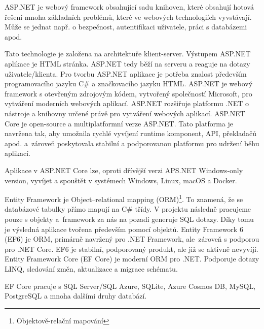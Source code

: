 \documentclass[a4paper, 12pt]{report}
\begin{document}
			ASP.NET je webový framework obsahující sadu knihoven, které obsahují hotová řešení mnoha základních problémů, které ve webových technologiích vyvstávají. Může se jednat např. o bezpečnost, autentifikaci uživatele, práci s databázemi apod.\par
			Tato technologie je založena na architektuře klient-server. Výstupem ASP.NET aplikace je HTML stránka. ASP.NET tedy běží na serveru a reaguje na dotazy uživatele/klienta. Pro tvorbu ASP.NET aplikace je potřeba znalost především programovacího jazyku C\# a značkovacího jazyku HTML.\cite{ASP.NET_Lekce1}
            ASP.NET je webový framework s otevřeným zdrojovým kódem, vytvořený společností Microsoft, pro vytváření moderních webových aplikací. ASP.NET rozšiřuje platformu .NET o nástroje a knihovny určené právě pro vytváření webových aplikací.\cite{ASP.NET}
            ASP.NET Core je open-source a multiplatformní verze ASP.NET. Tato platforma je navržena tak, aby umožnila rychlé vyvíjení runtime komponent, API, překladačů apod. a~zároveň poskytovala stabilní a podporovanou platformu pro udržení běhu aplikací.\par
			Aplikace v ASP.NET Core lze, oproti dřívější verzi APS.NET Windows-only version, vyvíjet a spouštět v systémech Windows, Linux, macOS a Docker.\cite{ASP.NET_Core}

        Entity Framework je Object–relational mapping (ORM)\footnote{Objektově-relační mapování}. To znamená, že se databázové tabulky přímo mapují na C\# třídy. V projektu následně pracujeme pouze s objekty a~framework za nás na pozadí generuje SQL dotazy. Díky tomu je výsledná aplikace tvořena především pomocí objektů.\cite{ASP.NET_Lekce8}
            Entity Framework 6 (EF6) je ORM, primárně navržený pro .NET Framework, ale~zároveň s podporou pro .NET Core. EF6 je stabilní, podporovaný produkt, ale již se aktivně nevyvíjí.\cite{EF6_EFCore}
			Entity Framework Core (EF Core) je moderní ORM pro .NET. Podporuje dotazy LINQ, sledování změn, aktualizace a migrace schématu.\par EF Core pracuje s SQL Server/SQL Azure, SQLite, Azure Cosmos DB, MySQL, PostgreSQL a mnoha dalšími druhy databází.\cite{EF6_EFCore}
\end{document}
